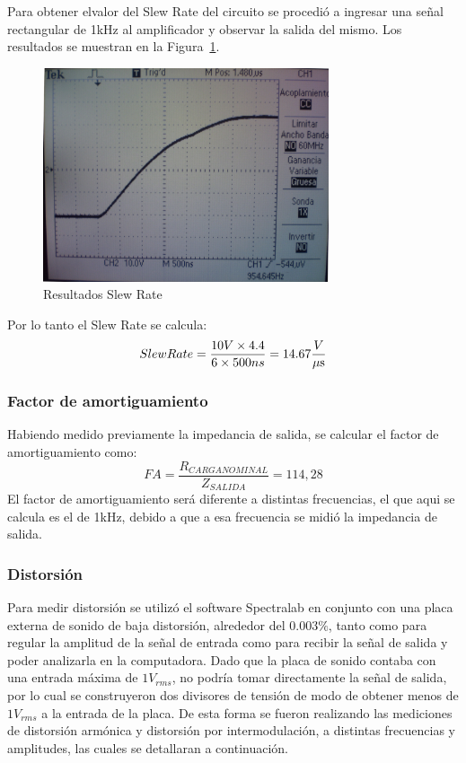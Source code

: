 Para obtener elvalor del Slew Rate del circuito se procedió a ingresar una señal rectangular de 1kHz al amplificador y observar la salida del mismo. Los resultados se muestran en la Figura~\ref{slew_rate_completo}.

\begin{figure}[H]
\centering
\includegraphics[width=0.75\textwidth]{img/slew_rate_salida.jpg}
\caption{Resultados Slew Rate}
\label{slew_rate_completo} 
\end{figure}


Por lo tanto el Slew Rate se calcula:
$$
Slew Rate =\frac{10V \times 4.4}{6 \times 500ns} = 14.67 \frac{V}{\mu\mbox{s}}
$$
\medskip
\subsubsection{Factor de amortiguamiento}

Habiendo medido previamente la impedancia de salida, se calcular el factor de amortiguamiento
como: 
$$
FA = \frac{R_{CARGA NOMINAL}}{Z_{SALIDA}} = 114,28
$$
El factor de amortiguamiento será diferente a distintas frecuencias, el que aqui se calcula es el de 1kHz, debido a que a esa frecuencia se midió la impedancia de salida.

\subsubsection{Distorsión}

Para medir distorsión se utilizó el software Spectralab en conjunto con una placa externa de sonido de baja distorsión, alrededor del $0.003\%$, tanto como para regular la amplitud de la señal de entrada como para recibir la señal de salida y poder analizarla en la computadora.
Dado que la placa de sonido contaba con una entrada máxima de $1V_{rms}$, no podría tomar directamente la señal de salida, por lo cual se construyeron dos divisores de tensión de modo de obtener menos de $1V_{rms}$ a la entrada de la placa.
De esta forma se fueron realizando las mediciones de distorsión armónica y distorsión por intermodulación, a distintas frecuencias y amplitudes, las cuales se detallaran a continuación.

